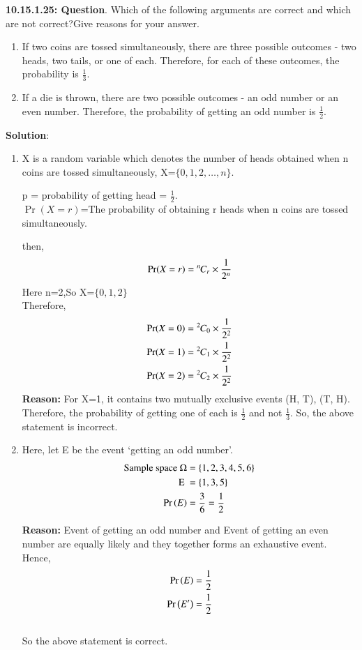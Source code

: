 \documentclass[journal,12pt,twocolumn]{IEEEtran}
\begin{document}
\textbf{10.15.1.25: Question}. Which of the following arguments are correct and which are not correct?Give reasons for your answer.
\begin{enumerate}
\item If two coins are tossed simultaneously, there are three possible outcomes - two heads, two tails, or one of each. Therefore, for each of these outcomes, the probability is $\frac{1}{3}$.

\item If a die is thrown, there are two possible outcomes - an odd number or an even number. Therefore, the probability of getting an odd number is $\frac{1}{2}$.
\end{enumerate}
\textbf{Solution}:
\begin{enumerate}
\item X is a random variable which denotes the number of heads obtained when n coins are tossed simultaneously, X=$\{0,1,2,\ldots,n\}$.

 p = probability of getting head = $\frac{1}{2}$.\\
 
 $\Pr(X=r)$=The probability of obtaining r heads when n coins are tossed simultaneously.
 
then,
\begin{align}
	\Pr(X=r) = {{}^{n}\mkern-1muC_{r}} \times \frac{1}{2^n}
\end{align}
Here n=2,So X=$\{0, 1, 2\}$ \\
Therefore,
\begin{align}
       \Pr(X=0) &= {{}^{2}\mkern-1muC_{0}} \times \frac{1}{2^2}\\
       \Pr(X=1) &= {{}^{2}\mkern-1muC_{1}} \times \frac{1}{2^2}\\
       \Pr(X=2) &= {{}^{2}\mkern-1muC_{2}} \times \frac{1}{2^2}
\end{align}
\textbf{Reason:} For X=1, it contains two mutually exclusive events (H, T), (T, H). Therefore, the probability of getting one of each is $\frac{1}{2}$ and not $\frac{1}{3}$. So, the above statement is incorrect.

\item Here, let E be the event ‘getting an odd number’.
\begin{align}
\text{Sample space }\Omega &= \{1,2,3,4,5,6\} \\
\text{E } &= \{1,3,5\} \\
	\Pr\left(E\right) &= \frac{3}{6} = \frac{1}{2}
\end{align}

\textbf{Reason:} Event of getting an odd number and Event of getting an even number are equally likely and they together forms an exhaustive event.
Hence,
\begin{align}
	\Pr\left(E\right) &= \frac{1}{2}\\
	\Pr\left(E^\prime\right) &= \frac{1}{2}
\end{align}
\\So the above statement is correct.
\end{enumerate}
\end{document}
